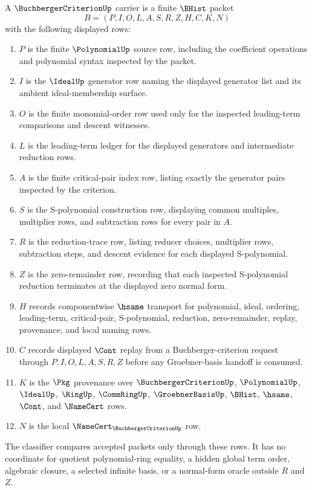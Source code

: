 \begin{definition}
\label{def:buchberger-criterion-carrier}
A $\BuchbergerCriterionUp$ carrier is a finite $\BHist$ packet
$$
B=(P,I,O,L,A,S,R,Z,H,C,K,N)
$$
with the following displayed rows:
\begin{enumerate}
\item $P$ is the finite $\PolynomialUp$ source row, including the coefficient operations and polynomial syntax inspected by the packet.
\item $I$ is the $\IdealUp$ generator row naming the displayed generator list and its ambient ideal-membership surface.
\item $O$ is the finite monomial-order row used only for the inspected leading-term comparisons and descent witnesses.
\item $L$ is the leading-term ledger for the displayed generators and intermediate reduction rows.
\item $A$ is the finite critical-pair index row, listing exactly the generator pairs inspected by the criterion.
\item $S$ is the S-polynomial construction row, displaying common multiples, multiplier rows, and subtraction rows for every pair in $A$.
\item $R$ is the reduction-trace row, listing reducer choices, multiplier rows, subtraction steps, and descent evidence for each displayed S-polynomial.
\item $Z$ is the zero-remainder row, recording that each inspected S-polynomial reduction terminates at the displayed zero normal form.
\item $H$ records componentwise $\hsame$ transport for polynomial, ideal, ordering, leading-term, critical-pair, S-polynomial, reduction, zero-remainder, replay, provenance, and local naming rows.
\item $C$ records displayed $\Cont$ replay from a Buchberger-criterion request through $P,I,O,L,A,S,R,Z$ before any Groebner-basis handoff is consumed.
\item $K$ is the $\Pkg$ provenance over $\BuchbergerCriterionUp$, $\PolynomialUp$, $\IdealUp$, $\RingUp$, $\CommRingUp$, $\GroebnerBasisUp$, $\BHist$, $\hsame$, $\Cont$, and $\NameCert$ rows.
\item $N$ is the local $\NameCert_{\BuchbergerCriterionUp}$ row.
\end{enumerate}
The classifier compares accepted packets only through these rows. It has no coordinate for quotient polynomial-ring equality, a hidden global term order, algebraic closure, a selected infinite basis, or a normal-form oracle outside $R$ and $Z$.
\end{definition}


